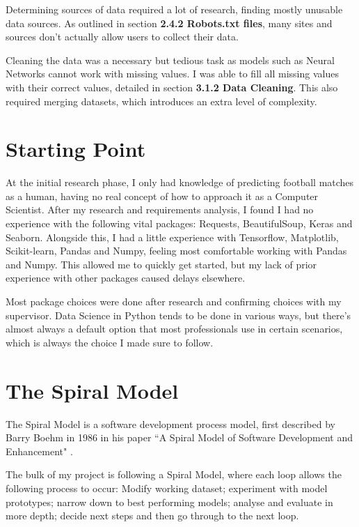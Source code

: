 \documentclass[12pt,a4paper,twoside,openright]{report}
\begin{document}
Determining sources of data required a lot of research, finding mostly unusable data sources. As outlined in section \textbf{2.4.2 Robots.txt files}, many sites and sources don't actually allow users to collect their data. 

Cleaning the data was a necessary but tedious task as models such as Neural Networks cannot work with missing values. I was able to fill all missing values with their correct values, detailed in section \textbf{3.1.2 Data Cleaning}. This also required merging datasets, which introduces an extra level of complexity.

\section{Starting Point}

At the initial research phase, I only had knowledge of predicting football matches as a human, having no real concept of how to approach it as a Computer Scientist. After my research and requirements analysis, I found I had no experience with the following vital packages: Requests, BeautifulSoup, Keras and Seaborn. Alongside this, I had a little experience with Tensorflow, Matplotlib, Scikit-learn, Pandas and Numpy, feeling most comfortable working with Pandas and Numpy. This allowed me to quickly get started, but my lack of prior experience with other packages caused delays elsewhere.

Most package choices were done after research and confirming choices with my supervisor. Data Science in Python tends to be done in various ways, but there's almost always a default option that most professionals use in certain scenarios, which is always the choice I made sure to follow.

\section{The Spiral Model}

The Spiral Model is a software development process model, first described by Barry Boehm in 1986 in his paper ``A Spiral Model of Software Development and Enhancement" \cite{spiral}.

The bulk of my project is following a Spiral Model, where each loop allows the following process to occur: Modify working dataset; experiment with model prototypes; narrow down to best performing models; analyse and evaluate in more depth; decide next steps and then go through to the next loop. 
\end{document}
